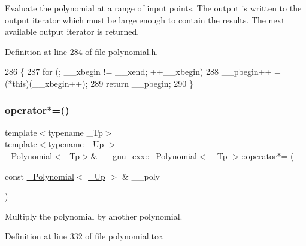 Evaluate the polynomial at a range of input points. The output is written to the output iterator which must be large enough to contain the results. The next available output iterator is returned. 

Definition at line 284 of file polynomial.\+h.


\begin{DoxyCode}
286         \{
287           \textcolor{keywordflow}{for} (; \_\_xbegin != \_\_xend; ++\_\_xbegin)
288             \_\_pbegin++ = (*\textcolor{keyword}{this})(\_\_xbegin++);
289           \textcolor{keywordflow}{return} \_\_pbegin;
290         \}
\end{DoxyCode}
\mbox{\label{class____gnu__cxx_1_1__Polynomial_a5e5dae4944bc0352b6b360f8decd2d07}} 
\subsubsection{\texorpdfstring{operator$\ast$=()}{operator*=()}\hspace{0.1cm}{\footnotesize\ttfamily [1/3]}}
{\footnotesize\ttfamily template$<$typename \+\_\+\+Tp$>$ \\
template$<$typename \+\_\+\+Up $>$ \\
\hyperlink{class____gnu__cxx_1_1__Polynomial}{\+\_\+\+Polynomial}$<$\+\_\+\+Tp$>$\& \hyperlink{class____gnu__cxx_1_1__Polynomial}{\+\_\+\+\_\+gnu\+\_\+cxx\+::\+\_\+\+Polynomial}$<$ \+\_\+\+Tp $>$\+::operator$\ast$= (\begin{DoxyParamCaption}\item[{const \hyperlink{class____gnu__cxx_1_1__Polynomial}{\+\_\+\+Polynomial}$<$ \hyperlink{class____gnu__cxx_1_1__Polynomial_a242114d4b86648a5dff67a8221f80d40}{\+\_\+\+Up} $>$ \&}]{\+\_\+\+\_\+poly }\end{DoxyParamCaption})}

Multiply the polynomial by another polynomial. 

Definition at line 332 of file polynomial.\+tcc.


